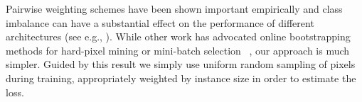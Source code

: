\documentclass[10pt,twocolumn,letterpaper]{article}
\def\x{{\bf x}}
\newtheorem{lemmas}{Lemma}
\begin{document}
Pairwise weighting schemes have been shown important empirically
\cite{fathi2017semantic} and class imbalance can have a substantial effect on
the performance of different architectures (see e.g., \cite{lin2017focal}).
While other work has advocated online bootstrapping methods for hard-pixel
mining or mini-batch selection ~\cite{loshchilov2015online, kong2016photo,
shrivastava2016training,wu2016bridging},
our approach is much simpler. Guided by
this result we simply use uniform random sampling of pixels during training,
appropriately weighted by instance size in order to estimate the loss.
\end{document}
